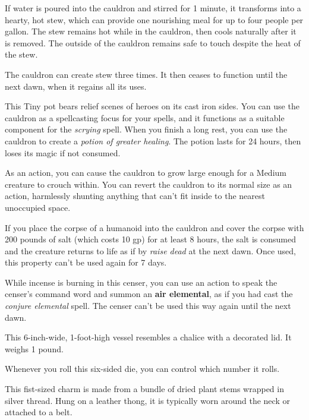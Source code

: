 \documentclass[10pt,a4paper,twoside,bg=print,twocolumn,openany,nodeprecatedcode]{dndbook}
\begin{document}
If water is poured into the cauldron and stirred for 1 minute, it transforms into a hearty, hot stew, which can provide one nourishing meal for up to four people per gallon. The stew remains hot while in the cauldron, then cools naturally after it is removed. The outside of the cauldron remains safe to touch despite the heat of the stew.

The cauldron can create stew three times. It then ceases to function until the next dawn, when it regains all its uses.

This Tiny pot bears relief scenes of heroes on its cast iron sides. You can use the cauldron as a spellcasting focus for your spells, and it functions as a suitable component for the \textit{scrying} spell. When you finish a long rest, you can use the cauldron to create a \textit{potion of greater healing}. The potion lasts for 24 hours, then loses its magic if not consumed.

As an action, you can cause the cauldron to grow large enough for a Medium creature to crouch within. You can revert the cauldron to its normal size as an action, harmlessly shunting anything that can't fit inside to the nearest unoccupied space.

If you place the corpse of a humanoid into the cauldron and cover the corpse with 200 pounds of salt (which costs 10 gp) for at least 8 hours, the salt is consumed and the creature returns to life as if by \textit{raise dead} at the next dawn. Once used, this property can't be used again for 7 days.

While incense is burning in this censer, you can use an action to speak the censer's command word and summon an \textbf{air elemental}, as if you had cast the \textit{conjure elemental} spell. The censer can't be used this way again until the next dawn.

This 6-inch-wide, 1-foot-high vessel resembles a chalice with a decorated lid. It weighs 1 pound.

Whenever you roll this six-sided die, you can control which number it rolls.

This fist-sized charm is made from a bundle of dried plant stems wrapped in silver thread. Hung on a leather thong, it is typically worn around the neck or attached to a belt.
\end{document}

